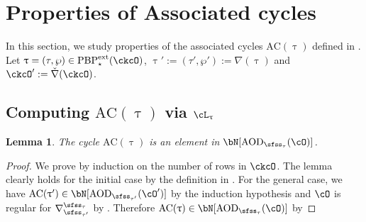 \documentclass[12pt,a4paper]{amsart}
\newcommand{\AC}{\mathrm{AC}}
\def\DD{\nabla}
\numberwithin{equation}{section}
\newtheorem{lem}[thm]{Lemma}
\theoremstyle{remark}
\def\PBPes{\mathrm{PBP}^{\mathrm{ext}}_{\star}}
\def\ckcOp{\ckcO^{\prime}}
\def\uptaup{\uptau^{\prime}}
\def\ckDD{{\check\DD}}
\begin{document}
\section{Properties of Associated cycles}
\label{sec:ACC}

\def\dsign{{}^d\mathrm{Sign}}

\def\acm{\cL}
\def\acme{\tilde{\cL}}
\def\dlifttso{{\check \vartheta}_{\sfss_{\tau'},\cO'}^{\sfss_{\tau},\;\cO}}
\def\DDtss{\DD_{\sfss_{\tau'}}^{\sfss_{\tau}}}
\def\taut{\tau_{\bftt}}

In this section, we study properties of the associated cycles $\AC(\uptau)$
defined in .
Let $\uptau=(\tau,\wp)\in \PBPes(\ckcO)$, $\uptau' := (\tau',\wp'):=\DD(\uptau)$ and  $\ckcOp:=\ckDD(\ckcO)$.

\subsection{Computing $\AC(\uptau)$ via $\ac_{\uptau}$}

\begin{lem}\label{lem:actau}
  The cycle $\AC(\uptau)$ is an element in $\bN[\AOD_{\sfss_\tau}(\cO)]$.
\end{lem}
\begin{proof}
We prove by induction on the number of rows in $\ckcO$. The lemma clearly holds
for the initial case by the definition in . For the general
case, we have $\AC(\uptaup)\in \bN[\AOD_{\sfss_{\tau'}}(\cO')]$ by the induction
hypothesis and $\cO$ is regular for $\DDtss$ by . Therefore
$\AC(\uptau)\in \bN[\AOD_{\sfss_\tau}(\cO)]$  by 
\end{proof}
\end{document}
